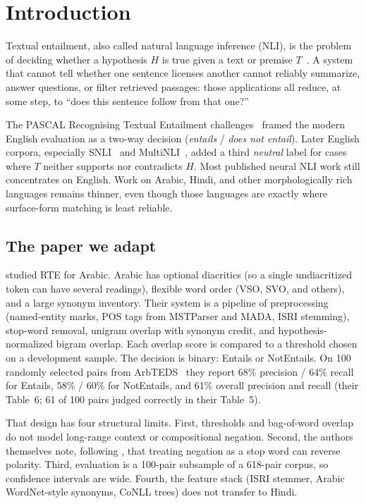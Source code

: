 \documentclass[conference]{IEEEtran}
\begin{document}
\section{Introduction}
\label{sec:intro}

Textual entailment, also called natural language inference (NLI), is the problem of deciding whether a hypothesis $H$ is true given a text or premise $T$~\citep{barhaim2006rte,bowman2015snli}. A system that cannot tell whether one sentence licenses another cannot reliably summarize, answer questions, or filter retrieved passages: those applications all reduce, at some step, to ``does this sentence follow from that one?''

The PASCAL Recognising Textual Entailment challenges~\citep{barhaim2006rte} framed the modern English evaluation as a two-way decision (\emph{entails} / \emph{does not entail}). Later English corpora, especially SNLI~\citep{bowman2015snli} and MultiNLI~\citep{williams2018snli}, added a third \emph{neutral} label for cases where $T$ neither supports nor contradicts $H$. Most published neural NLI work still concentrates on English. Work on Arabic, Hindi, and other morphologically rich languages remains thinner, even though those languages are exactly where surface-form matching is least reliable.

\subsection{The paper we adapt}
\citet{khader2016textual} studied RTE for Arabic. Arabic has optional diacritics (so a single undiacritized token can have several readings), flexible word order (VSO, SVO, and others), and a large synonym inventory. Their system is a pipeline of preprocessing (named-entity marks, POS tags from MSTParser and MADA, ISRI stemming), stop-word removal, unigram overlap with synonym credit, and hypothesis-normalized bigram overlap. Each overlap score is compared to a threshold chosen on a development sample. The decision is binary: Entails or NotEntails. On 100 randomly selected pairs from ArbTEDS~\citep{alabbas2013dataset} they report 68\% precision / 64\% recall for Entails, 58\% / 60\% for NotEntails, and 61\% overall precision and recall (their Table~6; 61 of 100 pairs judged correctly in their Table~5).

That design has four structural limits. First, thresholds and bag-of-word overlap do not model long-range context or compositional negation. Second, the authors themselves note, following \citet{alkhawaldeh2015negation}, that treating negation as a stop word can reverse polarity. Third, evaluation is a 100-pair subsample of a 618-pair corpus, so confidence intervals are wide. Fourth, the feature stack (ISRI stemmer, Arabic WordNet-style synonyms, CoNLL trees) does not transfer to Hindi.
\end{document}
